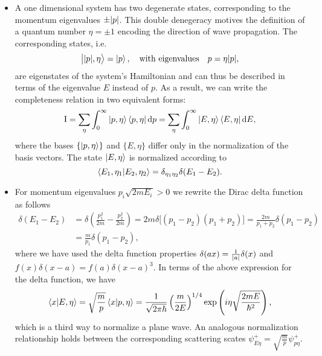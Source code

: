\documentclass[11pt, a4paper]{article}
\newcommand{\diff}{\mathop{}\!\mathrm{d}} %
\newcommand{\II}{\operatorname{I}}  %
\newcommand{\bket}[1]{\big | {#1} \big \rangle }
\begin{document}
\begin{itemize}
    \item A one dimensional system has two degenerate states, corresponding to the momentum eigenvalues $ \pm \abs{p} $. This double denegeracy motives the definition of a quantum number $ \eta = \pm 1$ encoding the direction of wave propagation. The corresponding states, i.e.
    \begin{equation*}
        \bket{\abs{p}, \eta} = \ket{p}, \quad \text{with eigenvalues} \quad p = \eta \abs{p},
    \end{equation*}
    are eigenstates of the system's Hamiltonian and can thus be described in terms of the eigenvalue $ E $ instead of $ p $. As a result, we can write the completeness relation in two equivalent forms:
    \begin{equation*}
        \II = \sum_{\eta} \int_{0}^{\infty} \ket{p, \eta} \bra{p, \eta} \diff p = \sum_{\eta} \int_{0}^{\infty} \ket{E, \eta} \bra{E, \eta} \diff E,
    \end{equation*}
    where the bases $ \{\ket{p, \eta}\} $ and $ \{E, \eta\} $ differ only in the normalization of the basis vectors. The state $ \ket{E, \eta} $ is normalized according to
    \begin{equation*}
        \braket{E_{1}, \eta_{1}}{E_{2}, \eta_{2}} = \delta_{\eta_{1}\eta_{2}}\delta(E_{1} -E_{2}).
    \end{equation*}

    \item For momentum eigenvalues $ p_{i} \sqrt{2mE_{i}} > 0 $ we rewrite the Dirac delta function as follows
    \begin{align*}
        \delta(E_{1} - E_{2}) &= \delta \left( \frac{p_{1}^{2}}{2m} - \frac{p_{2}^{2}}{2m} \right) = 2m \delta \big[ (p_{1} - p_{2})(p_{1} + p_{2}) \big] = \frac{2m}{p_{1} + p_{2}}\delta(p_{1} - p_{2})\\
        & = \frac{m}{p_{1}} \delta(p_{1} - p_{2}),
    \end{align*}
    where we have used the delta function properties $ \delta(ax) = \frac{1}{\abs{a}}\delta(x) $ and $ f(x)\delta(x-a) = f(a)\delta(x-a)^{3} $. In terms of the above expression for the delta function, we have
    \begin{equation*}
        \braket{x}{E, \eta} = \sqrt{\frac{m}{p}} \braket{x}{p, \eta} = \frac{1}{\sqrt{2\pi \hbar}} \left( \frac{m}{2E} \right)^{1/4} \exp \left( i\eta \sqrt{\frac{2m E}{\hbar^{2}}} \right),
    \end{equation*}
    which is a third way to normalize a plane wave. An analogous normalization relationship holds between the corresponding scattering scates $ \psi_{E\eta}^{+} = \sqrt{\frac{m}{p}} \psi_{p\eta}^{+} $.

\end{itemize}
\end{document}
